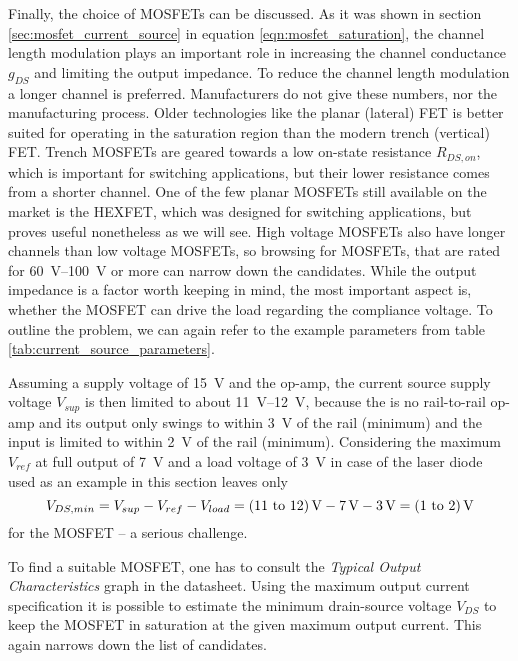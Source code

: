 Finally, the choice of MOSFETs can be discussed. As it was shown in section \ref{sec:mosfet_current_source} in equation \ref{eqn:mosfet_saturation}, the channel length modulation plays an important role in increasing the channel conductance $g_{DS}$ and limiting the output impedance. To reduce the channel length modulation a longer channel is preferred. Manufacturers do not give these numbers, nor the manufacturing process. Older technologies like the planar (lateral) FET is better suited for operating in the saturation region than the modern trench (vertical) FET. Trench MOSFETs are geared towards a low on-state resistance $R_{DS,on}$, which is important for switching applications, but their lower resistance comes from a shorter channel. One of the few planar MOSFETs still available on the market is the HEXFET, which was designed for switching applications, but proves useful nonetheless as we will see. High voltage MOSFETs also have longer channels than low voltage MOSFETs, so browsing for MOSFETs, that are rated for \qtyrange[range-units = single]{60}{100}{\V} or more can narrow down the candidates. While the output impedance is a factor worth keeping in mind, the most important aspect is, whether the MOSFET can drive the load regarding the compliance voltage. To outline the problem, we can again refer to the example parameters from table \ref{tab:current_source_parameters}.

Assuming a supply voltage of \qty{15}{\V} and the  op-amp, the current source supply voltage $V_{sup}$ is then limited to about \qtyrange[range-units = single]{11}{12}{\V}, because the  is no rail-to-rail op-amp and its output only swings to within \qty{3}{\V} of the rail (minimum) and the input is limited to within \qty{2}{\V} of the rail (minimum). Considering the maximum $V_{ref}$ at full output of \qty{7}{\V} and a load voltage of \qty{3}{\V} in case of the  \cite{datasheet_thorlabs_780nm} laser diode used as an example in this section leaves only
\begin{equation}
    V_{DS,min} = V_{sup} - V_{ref} - V_{load} = \text{\qtyrange[range-units = bracket]{11}{12}{\V}} - \qty{7}{\V} - \qty{3}{\V} = \text{\qtyrange[range-units = bracket]{1}{2}{\V}} \label{eqn:minimum_mosfet_vds}
\end{equation}
for the MOSFET -- a serious challenge.

To find a suitable MOSFET, one has to consult the \textit{Typical Output Characteristics} graph in the datasheet. Using the maximum output current specification it is possible to estimate the minimum drain-source voltage $V_{DS}$ to keep the MOSFET in saturation at the given maximum output current. This again narrows down the list of candidates.

